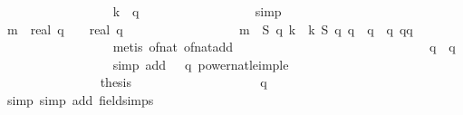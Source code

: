 \begin{isabellebody}
\ \ \ \ \ \ \ \ \ \ \ \ \ \ \ \ \isamarkupfalse%
\ {\isacharbackquoteopen}k\ {\isasymin}\ {\isacharbraceleft}{}{\isachardot}{\isachardot}{\isacharless}q{\isacharplus}{}{\isacharplus}{}{\isacharbraceright}{\isacharbackquoteclose}\isanewline
\ \ \ \ \ \ \ \ \ \ \ \ \ \ \ \ \isamarkupfalse%
\ simp\isanewline
\ \ \ \ \ \ \ \ \ \ \ \ \ \ \isamarkupfalse%
\ {\isachardoublequoteopen}m{\isacharprime}\ {\isacharequal}\ {\isacharparenleft}real\ q\ {\isacharminus}\ {}{\isacharparenright}\ {\isacharslash}\ real\ q{\isachardoublequoteclose}\isanewline
\ \ \ \ \ \ \ \ \ \ \ \ \ \ \ \ \isamarkupfalse%
\ {\isacharbackquoteopen}m{\isacharprime}\ {\isacharequal}\ {\isacharquery}S\ {\isacharparenleft}q{\isacharplus}{}{\isacharparenright}\ k\ {\isacharslash}\ k{\isacharbackquoteclose}\ {\isacharbackquoteopen}{\isacharquery}S\ {\isacharparenleft}q{\isacharplus}{}{\isacharparenright}\ {\isacharparenleft}q{\isacharplus}{}{\isacharparenright}\ {\isacharequal}\ q\ {\isacharminus}\ {}{\isacharslash}q{\isacharbackquoteclose}\ qq\isanewline
\ \ \ \ \ \ \ \ \ \ \ \ \ \ \ \ \isamarkupfalse%
\ {\isacharparenleft}metis\ of{\isacharunderscore}nat{\isacharunderscore}{}\ of{\isacharunderscore}nat{\isacharunderscore}add{\isacharparenright}\isanewline
\ \ \ \ \ \ \ \ \ \ \ \ \ \ \isamarkupfalse%
\isanewline
\ \ \ \ \ \ \ \ \ \ \ \ \ \ \isamarkupfalse%
\ {\isachardoublequoteopen}q\ {\isasymle}\ q{\isacharcircum}{}{\isachardoublequoteclose}\isanewline
\ \ \ \ \ \ \ \ \ \ \ \ \ \ \ \ \isamarkupfalse%
\ {\isacharparenleft}simp\ add{\isacharcolon}\ {\isacharbackquoteopen}{}\ {\isasymle}\ q{\isacharbackquoteclose}\ power{}{\isacharunderscore}nat{\isacharunderscore}le{\isacharunderscore}imp{\isacharunderscore}le{\isacharparenright}\isanewline
\ \ \ \ \ \ \ \ \ \ \ \ \ \ \isamarkupfalse%
\isanewline
\ \ \ \ \ \ \ \ \ \ \ \ \ \ \isamarkupfalse%
\ {\isacharquery}thesis\isanewline
\ \ \ \ \ \ \ \ \ \ \ \ \ \ \ \ \isamarkupfalse%
\ {\isacharbackquoteopen}{}\ {\isasymle}\ q{\isacharbackquoteclose}\isanewline
\ \ \ \ \ \ \ \ \ \ \ \ \ \ \ \ \isamarkupfalse%
\ simp\ {\isacharparenleft}simp\ add{\isacharcolon}\ field{\isacharunderscore}simps{\isacharparenright}\isanewline
\ \ \ \ \ \ \ \ \ \ \ \ \isamarkupfalse%
\isanewline
\ \ \ \ \ \ \ \ \ \ \isamarkupfalse%

\end{isabellebody}
